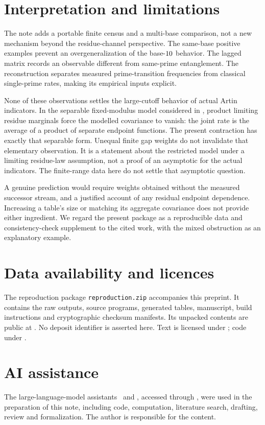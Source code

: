 \documentclass[11pt]{article}
\begin{document}
\section{Interpretation and limitations}
The note adds a portable finite census and a multi-base comparison, not a new
mechanism beyond the residue-channel perspective. The same-base positive
examples prevent an overgeneralization of the base-$10$ behavior. The
lagged matrix records an observable different from same-prime entanglement.
The reconstruction separates measured prime-transition frequencies from
classical single-prime rates, making its empirical inputs explicit.

None of these observations settles the large-cutoff behavior of actual Artin
indicators. In the separable fixed-modulus model considered in
\cite{baldconsolidated}, product limiting residue marginals force the modelled
covariance to vanish: the joint rate is the average of a product of separate
endpoint functions. The present contraction has exactly that separable form.
Unequal finite gap weights do not invalidate that elementary observation.
It is a statement about the restricted model under a limiting residue-law
assumption, not a proof of an asymptotic for the actual indicators. The
finite-range data here do not settle that asymptotic question.

A genuine prediction would require weights obtained without the measured
successor stream, and a justified account of any residual endpoint dependence.
Increasing a table's size or matching its aggregate covariance does not provide
either ingredient. We regard the present package as a reproducible data and
consistency-check supplement to the cited work, with the mixed obstruction as
an explanatory example.

\section*{Data availability and licences}
The reproduction package \texttt{reproduction.zip} accompanies this preprint.
It contains the raw outputs, source programs, generated tables, manuscript,
build instructions and cryptographic checksum manifests. Its unpacked contents
are public at \RepoLink. No deposit identifier is asserted here.
Text is licensed under \TextLicense; code under \CodeLicense.

\section*{AI assistance}
The large-language-model assistants \AIAstra\ and \AIOpus, accessed
through \AIPlatform, were used in the preparation of this note, including code,
computation, literature search, drafting, review and formalization. The author is
responsible for the content.


\end{document}
